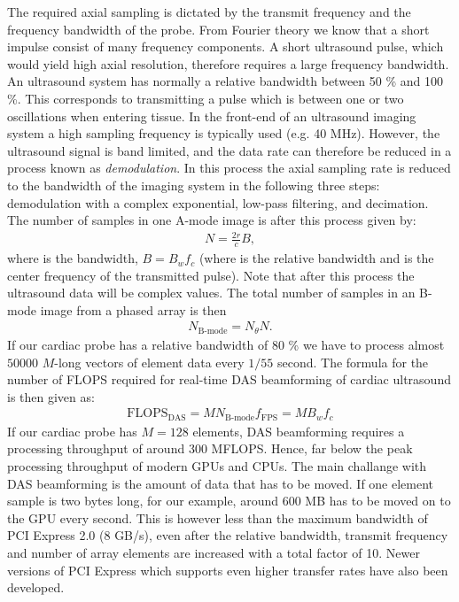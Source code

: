 The required axial sampling is dictated by the transmit frequency and the frequency bandwidth of the probe. From Fourier theory we know that a short impulse consist of many frequency components. A short ultrasound pulse, which would yield high axial resolution, therefore requires a large frequency bandwidth. An ultrasound system has normally a relative bandwidth between 50 \% and 100 \%. This corresponds to transmitting a pulse which is between one or two oscillations when entering tissue. In the front-end of an ultrasound imaging system a high sampling frequency is typically used (e.g. 40 MHz). However, the ultrasound signal is band limited, and the data rate can therefore be reduced in a process known as \textit{ demodulation}. In this process the axial sampling rate is reduced to the bandwidth of the imaging system in the following three steps: demodulation with a complex exponential, low-pass filtering, and decimation. The number of samples in one A-mode image is after this process given by:
\begin{align}
N = \frac{2r}{c}B,
\end{align}
where  is the bandwidth, $B = B_wf_c$ (where  is the relative bandwidth and  is the center frequency of the transmitted pulse). Note that after this process the ultrasound data will be complex values. The total number of samples in an B-mode image from a phased array is then 
\begin{align}
N_{\text{B-mode}} = N_\theta N.
\end{align}
If our cardiac probe has a relative bandwidth of $80$ \% we have to process almost $50000$ $M$-long vectors of element data every $1/55$ second. The formula for the number of FLOPS required for real-time DAS beamforming of cardiac ultrasound is then given as:
\begin{align}
\text{FLOPS}_{\text{DAS}} = MN_{\text{B-mode}}f_{\text{FPS}} = MB_wf_c
\end{align}
If our cardiac probe has $M=128$ elements, DAS beamforming requires a processing throughput of around $300$ MFLOPS. Hence, far below the peak processing throughput of modern GPUs and CPUs. The main challange with DAS beamforming is the amount of data that has to be moved. If one element sample is two bytes long, for our example, around 600 MB has to be moved on to the GPU every second. This is however less than the maximum bandwidth of PCI Express 2.0 (8 GB/s), even after the relative bandwidth, transmit frequency and number of array elements are increased with a total factor of 10. Newer versions of PCI Express which supports even higher transfer rates have also been developed.

